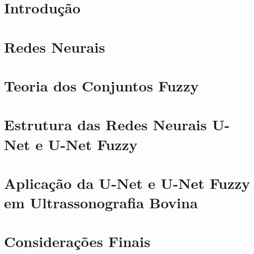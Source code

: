 \documentclass[12pt,a4paper,oneside]{report}
\begin{document}

\newpage

\newpage

\newpage

\newpage
\newpage
\newpage
\tableofcontents

\chapter*{Introdução}



\chapter{Redes Neurais}

\chapter{Teoria dos Conjuntos Fuzzy}

\chapter{Estrutura das Redes Neurais U-Net e U-Net Fuzzy}

\chapter{Aplicação da U-Net e U-Net Fuzzy em Ultrassonografia Bovina}

\chapter{Considerações Finais}

\renewcommand{\bibname}{Referências Bibliográficas}

% 

\end{document}
